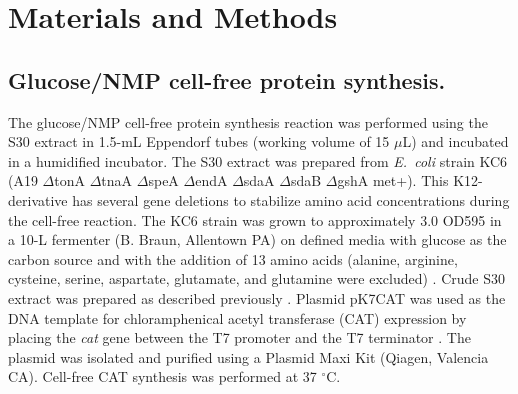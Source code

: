 \documentclass[journal=asbcd6,manuscript=article]{achemso}
\begin{document}
%

\clearpage

\section*{Materials and Methods}

\subsection*{Glucose/NMP cell-free protein synthesis.}
The glucose/NMP cell-free protein synthesis reaction was
performed using the S30 extract in 1.5-mL Eppendorf tubes (working volume of 15 $\mu$L) and incubated in a humidified incubator.
The S30 extract was prepared from \textit{E.~coli} strain KC6 (A19 $\Delta$tonA $\Delta$tnaA $\Delta$speA $\Delta$endA $\Delta$sdaA $\Delta$sdaB $\Delta$gshA met+).
This K12-derivative has several gene deletions to stabilize amino acid concentrations during the cell-free reaction.
The KC6 strain was grown to approximately 3.0 OD595 in a 10-L fermenter (B. Braun, Allentown PA) on defined media with glucose as the carbon source and with the addition of 13 amino acids (alanine, arginine, cysteine, serine, aspartate, glutamate, and glutamine were excluded) \cite{Zawada:2003}. Crude S30 extract was prepared as described previously \cite{Jewett:2002}.
Plasmid pK7CAT was used as the DNA template for chloramphenical acetyl transferase (CAT) expression by placing the \emph{cat} gene
between the T7 promoter and the T7 terminator \cite{Kigawa1995}.
The plasmid was isolated and purified using a Plasmid Maxi Kit (Qiagen, Valencia CA).
Cell-free CAT synthesis was performed at 37 $^{\circ}$C.
\end{document}
